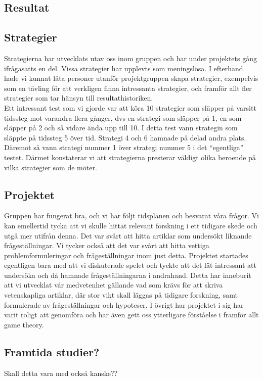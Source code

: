 \subsection{Resultat}

\subsection{Strategier}
Strategierna har utvecklats utav oss inom gruppen och har under projektets gång ifrågasatts en del. Vissa strategier har upplevts som meningslösa. I efterhand hade vi kunnat låta personer utanför projektgruppen skapa strategier, exempelvis som en tävling för att verkligen finna intressanta strategier, och framför allt fler strategier som tar hänsyn till resultathistoriken.\\

\noindent Ett intressant test som vi gjorde var att köra 10 strategier som släpper på varsitt tidssteg mot varandra flera gånger, dvs en strategi som släpper på 1, en som släpper på 2 och så vidare ända upp till 10. I detta test vann strategin som släppte på tidssteg 5 över tid. Strategi 4 och 6 hamnade på delad andra plats. Däremot så vann strategi nummer 1 över strategi nummer 5 i det “egentliga” testet. Därmet konstaterar vi att strategierna presterar väldigt olika beroende på vilka strategier som de möter.

\subsection{Projektet}
Gruppen har fungerat bra, och vi har följt tidsplanen och besvarat våra frågor. Vi kan emellertid tycka att vi skulle hittat relevant forskning i ett tidigare skede och utgå mer utifrån denna. Det var svårt att hitta artiklar som undersökt liknande frågeställningar. Vi tycker också att det var svårt att hitta vettiga problemformuleringar och frågeställningar inom just detta. Projektet startades egentligen bara med att vi diskuterade spelet och tyckte att det lät intressant att undersöka och då hamnade frågeställningarna i andrahand. Detta har inneburit att vi utvecklat vår medvetenhet gällande vad som krävs för att skriva vetenskapliga artiklar, där stor vikt skall läggas på tidigare forskning, samt formulerade av frågeställningar och hypoteser. I övrigt har projektet i sig har varit roligt att genomföra och har även gett oss ytterligare förståelse i framför allt game theory. 

\subsection{Framtida studier?}
Skall detta vara med också kanske??